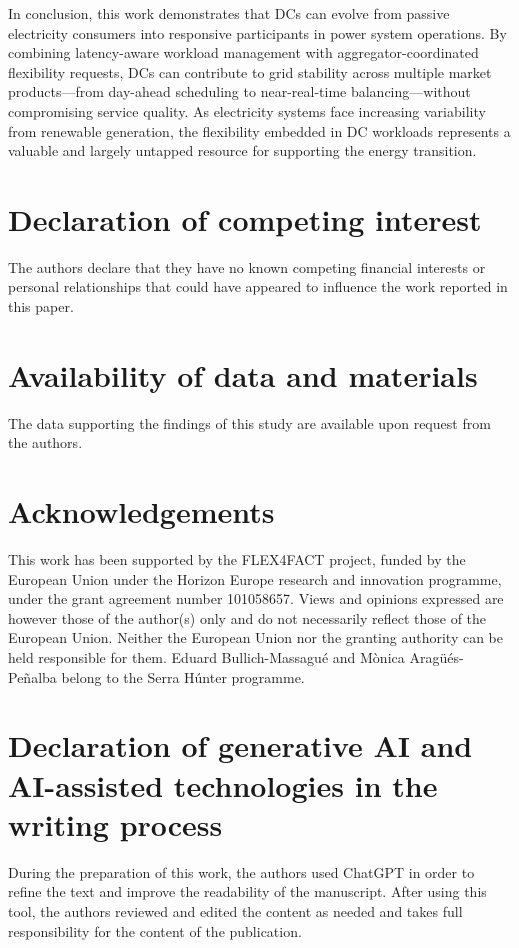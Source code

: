 \documentclass[preprint,12pt]{elsarticle}
\begin{document}
In conclusion, this work demonstrates that DCs can evolve from passive electricity consumers into responsive participants in power system operations. By combining latency-aware workload management with aggregator-coordinated flexibility requests, DCs can contribute to grid stability across multiple market products—from day-ahead scheduling to near-real-time balancing—without compromising service quality. As electricity systems face increasing variability from renewable generation, the flexibility embedded in DC workloads represents a valuable and largely untapped resource for supporting the energy transition.


\section*{Declaration of competing interest}
The authors declare that they have no known competing financial interests or personal relationships that could have appeared to influence the work reported in this paper.

\section*{Availability of data and materials}
The data supporting the findings of this study are available upon request from the authors.

\section*{Acknowledgements}
This work has been supported by the FLEX4FACT project, funded by the European Union under the Horizon Europe research and innovation programme, under the grant agreement number 101058657. Views and opinions expressed are however those of the author(s) only and do not necessarily reflect those of the European Union. Neither the European Union nor the granting authority can be held responsible for them. Eduard Bullich-Massagué and M\`{o}nica Arag\"{u}\'{e}s-Pe\~{n}alba belong to the Serra Húnter programme.

\section*{Declaration of generative AI and AI-assisted technologies in the writing process}
During the preparation of this work, the authors used ChatGPT in order to refine the text and improve the readability of the manuscript. After using this tool, the authors reviewed and edited the content as needed and takes full responsibility for the content of the publication.
\end{document}
